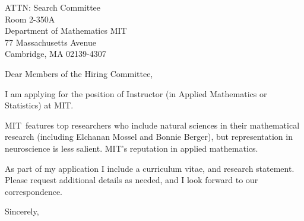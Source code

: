 \documentclass[11pt,a4paper]{letter}
\begin{document}

\def\School{MIT}

\begin{letter}
{ATTN: Search Committee\\
Room 2-350A\\
Department of Mathematics MIT\\
77 Massachusetts Avenue\\
Cambridge, MA 02139-4307}


\opening{Dear Members of the Hiring Committee,}

I am applying for the position of Instructor (in Applied Mathematics or Statistics) at \School. 



\School~features top researchers who include natural sciences in their mathematical research (including Elchanan Mossel and Bonnie Berger), but representation in neuroscience is less salient. \School's reputation in applied mathematics.



As part of my application I include a curriculum vitae, and research statement. Please request additional details as needed, and I look forward to our correspondence.

\closing{Sincerely,}
\end{letter}
\end{document}
